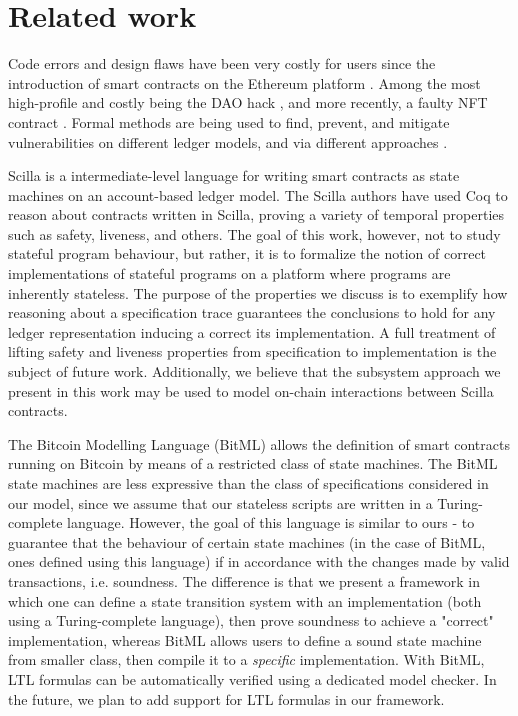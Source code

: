 \section{Related work}
\label{sec:related}

Code errors and design flaws have been very costly for users
since the introduction of smart contracts on the Ethereum platform \cite{survey}.
Among the most high-profile and costly being the DAO hack \cite{DAO},
and more recently, a faulty NFT contract \cite{nftbug}. Formal methods are being
used to find, prevent, and mitigate vulnerabilities on different ledger models, and via different
approaches \cite{formal}.

Scilla \cite{scilla} is a intermediate-level language for writing smart contracts as state
machines on an account-based ledger model.
The Scilla authors have used Coq to reason about contracts written in Scilla, proving a variety of
temporal properties such as safety, liveness, and others. The goal of this work,
however, not to study stateful program behaviour, but rather, it is to formalize
the notion of correct implementations
of stateful programs on a platform where programs are inherently stateless. The purpose of the
properties we discuss is to exemplify how reasoning about a
specification trace guarantees the conclusions to hold for any
ledger representation inducing a correct its implementation. A full treatment
of lifting safety and liveness properties from specification to implementation
is the subject of future work. Additionally, we believe that the subsystem approach
we present in this work may be used to model on-chain interactions between
Scilla contracts.

The Bitcoin Modelling Language (BitML) \cite{bitml} allows the definition of smart
contracts running on Bitcoin by means of a restricted class of state machines.
The BitML state machines are less expressive than the class of specifications
considered in our model, since we assume that our stateless scripts are written
in a Turing-complete language. However, the goal of this language is similar to
ours - to guarantee that the behaviour of certain state machines (in the case of BitML, ones defined
using this language) if in accordance with the changes made by valid transactions, i.e. soundness.
The difference is that we present a framework in which one can define a state
transition system with an implementation (both using a Turing-complete language),
then prove soundness to achieve a "correct" implementation, whereas BitML allows users to
define a sound state machine from smaller class, then compile it to a \emph{specific}
implementation. With BitML, LTL formulas can be automatically
verified using a dedicated model checker. In the future, we plan to add support for LTL formulas in
our framework.

